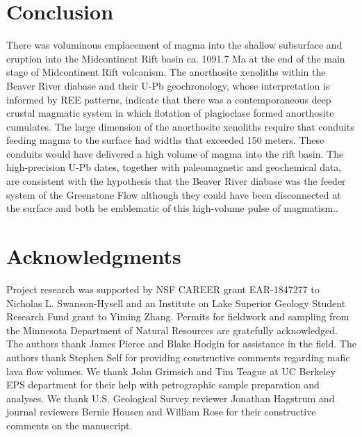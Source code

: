 \section{Conclusion}

There was voluminous emplacement of magma into the shallow subsurface and eruption into the Midcontinent Rift basin ca. 1091.7 Ma at the end of the main stage of Midcontinent Rift volcanism. The anorthosite xenoliths within the Beaver River diabase and their U-Pb geochronology, whose interpretation is informed by REE patterns, indicate that there was a contemporaneous deep crustal magmatic system in which flotation of plagioclase formed anorthosite cumulates. The large dimension of the anorthosite xenoliths require that conduits feeding magma to the surface had widths that exceeded 150 meters. These conduits would have delivered a high volume of magma into the rift basin. The high-precision U-Pb dates, together with paleomagnetic and geochemical data, are consistent with the hypothesis that the Beaver River diabase was the  feeder system of the Greenstone Flow although they could have been disconnected at the surface and both be emblematic of this high-volume pulse of magmatism..

\section{Acknowledgments}
Project research was supported by NSF CAREER grant EAR-1847277 to Nicholas L. Swanson-Hysell and an Institute on Lake Superior Geology Student Research Fund grant to Yiming Zhang. Permits for fieldwork and sampling from the Minnesota Department of Natural Resources are gratefully acknowledged. The authors thank James Pierce and Blake Hodgin for assistance in the field. The authors thank Stephen Self for providing constructive comments regarding mafic lava flow volumes. We thank John Grimsich and Tim Teague at UC Berkeley EPS department for their help with petrographic sample preparation and analyses. We thank U.S. Geological Survey reviewer Jonathan Hagstrum and journal reviewers Bernie Housen and William Rose for their constructive comments on the manuscript.
